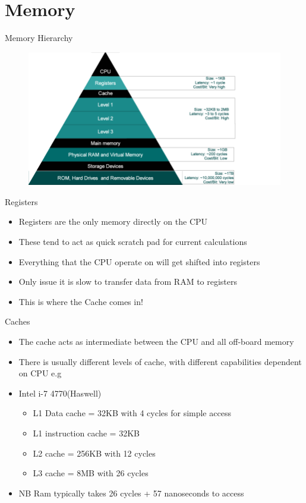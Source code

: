 \part{Memory}
\frame{\partpage}

\begin{frame}{Memory Hierarchy}
\begin{figure}
	\includegraphics[width=1.0\textwidth,height=0.8\textheight]{Memory-hierarchy}  
\end{figure}
\end{frame}

\begin{frame}{Registers}
	\begin{itemize}
		\pause \item Registers are the only memory directly on the CPU
		\pause \item These tend to act as quick scratch pad for current calculations
		\pause \item Everything that the CPU operate on will get shifted into registers
		\pause \item Only issue it is slow to transfer data from RAM to registers
		\pause \item This is where the Cache comes in!  
	\end{itemize}
\end{frame}

\begin{frame}{Caches}
	\begin{itemize}
		\pause \item The cache acts as intermediate between the CPU and all off-board memory
		\pause \item There is usually different levels of cache, with different capabilities dependent on CPU e.g
		\pause \item Intel i-7 4770(Haswell)
		\begin{itemize}
			\pause \item L1 Data cache = 32KB with 4 cycles for simple access
			\pause \item L1 instruction cache = 32KB
			\pause \item L2 cache = 256KB with 12 cycles
			\pause \item L3 cache = 8MB with 26 cycles
		\end{itemize}
		\pause \item NB Ram typically takes 26 cycles + 57 nanoseconds to access 
	\end{itemize}
\end{frame}

